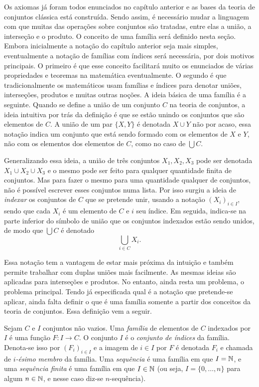 Os axiomas já foram todos enunciados no capítulo anterior e as bases da teoria de conjuntos clássica está construída. Sendo assim, é necessário mudar a linguagem com que muitas das operações sobre conjuntos são tratadas, entre elas a união, a interseção e o produto. O conceito de uma família será definido nesta seção. Embora inicialmente a notação do capítulo anterior seja mais simples, eventualmente a notação de famílias com índices será necessária, por dois motivos principais. O primeiro é que esse conceito facilitará muito os enunciados de várias propriedades e teoremas na matemática eventualmente. O segundo é que tradicionalmente os matemáticos usam famílias e índices para denotar uniões, interseções, produtos e muitas outras noções. A ideia básica de uma família é a seguinte. Quando se define a união de um conjunto $C$ na teoria de conjuntos, a ideia intuitiva por trás da definição é que se estão unindo os conjuntos que são elementos de $C$. A união de um par $\{X,Y\}$ é denotada $X \cup Y$ não por acaso, essa notação indica um conjunto que está sendo formado com os elementos de $X$ e $Y$, não com os elementos dos elementos de $C$, como no caso de $\bigcup C$. 

Generalizando essa ideia, a união de três conjuntos $X_1,X_2,X_3$ pode ser denotada $X_1 \cup X_2 \cup X_3$ e o mesmo pode ser feito para qualquer quantidade finita de conjuntos. Mas para fazer o mesmo para uma quantidade qualquer de conjuntos, não é possível escrever esses conjuntos numa lista. Por isso surgiu a ideia de \emph{indexar} os conjuntos de $C$ que se pretende unir, usando a notação $(X_i)_{i \in I}$, sendo que cada $X_i$ é um elemento de $C$ e $i$ seu índice. Em seguida, indica-se na parte inferior do símbolo de união que os conjuntos indexados estão sendo unidos, de modo que $\bigcup C$ é denotado
	\begin{equation*}
	\bigcup_{i \in C} X_i.
	\end{equation*}

Essa notação tem a vantagem de estar mais próxima da intuição e também permite trabalhar com duplas uniões mais facilmente. As mesmas ideias são aplicadas para interseções e produtos. No entanto, ainda resta um problema, o problema principal. Tendo  já especificada qual é a notação que pretende-se aplicar, ainda falta definir o que é uma família somente a partir dos conceitos da teoria de conjuntos. Essa definição vem a seguir.

\begin{defi}
Sejam $C$ e $I$ conjuntos não vazios. Uma \emph{família} de elementos de $C$ indexados por $I$ é uma função $F: I \to C$. O conjunto $I$ é o \emph{conjunto de índices} da família. Denota-se isso por $(F_i)_{i \in I}$ e a imagem de $i \in I$ por $F$ é denotada $F_i$ e chamada de \emph{$i$-ésimo membro} da família.
\noindent
Uma \emph{sequência} é uma família em que $I=\mathbb{N}$, e uma \emph{sequência finita} é uma família em que $I \in \mathbb{N}$ (ou seja, $I=\{0,\ldots,n\}$ para algum $n \in \mathbb{N}$, e nesse caso diz-se $n$-sequência).
\end{defi}

